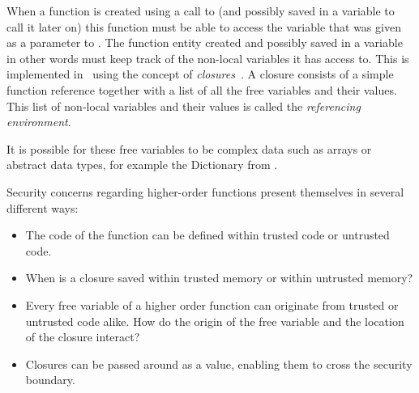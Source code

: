 %

When a function is created using a call to  (and possibly saved in a variable to call it later on) this function must be able to access the variable  that was given as a parameter to .
The function entity created and possibly saved in a variable in other words must keep track of the non-local variables it has access to.
This is implemented in \MiniML\ using the concept of \emph{closures}~\cite{Appel}.
A closure consists of a simple function reference together with a list of all the free variables and their values.%
This list of non-local variables and their values is called the \emph{referencing environment}.

It is possible for these free variables to be complex data such as arrays or abstract data types, for example the Dictionary from . 

Security concerns regarding higher-order functions present themselves in several different ways:

\begin{itemize}
\item The code of the function can be defined within trusted code or untrusted code.
\item When is a closure saved within trusted memory or within untrusted memory?
\item Every free variable of a higher order function can originate from trusted or untrusted code alike.
How do the origin of the free variable and the location of the closure interact?
\item Closures can be passed around as a value, enabling them to cross the security boundary.
\end{itemize}

